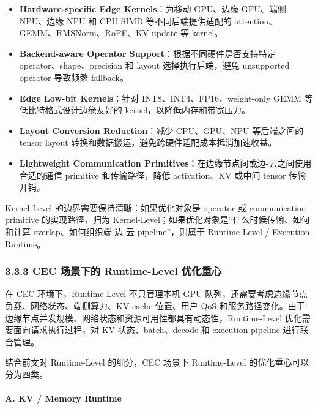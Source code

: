 \documentclass[a4paper,twocolumn,10pt]{ctexart}
\begin{document}
\begin{itemize}
\item \textbf{Hardware-specific Edge Kernels}：为移动 GPU、边缘 GPU、端侧 NPU、边缘 NPU 和 CPU SIMD 等不同后端提供适配的 attention、GEMM、RMSNorm、RoPE、KV update 等 kernel。

\item \textbf{Backend-aware Operator Support}：根据不同硬件是否支持特定 operator、shape、precision 和 layout 选择执行后端，避免 unsupported operator 导致频繁 fallback。

\item \textbf{Edge Low-bit Kernels}：针对 INT8、INT4、FP16、weight-only GEMM 等低比特格式设计边缘友好的 kernel，以降低内存和带宽压力。

\item \textbf{Layout Conversion Reduction}：减少 CPU、GPU、NPU 等后端之间的 tensor layout 转换和数据搬运，避免跨硬件适配成本抵消加速收益。

\item \textbf{Lightweight Communication Primitives}：在边缘节点间或边-云之间使用合适的通信 primitive 和传输路径，降低 activation、KV 或中间 tensor 传输开销。



\end{itemize}
Kernel-Level 的边界需要保持清晰：如果优化对象是 operator 或 communication primitive 的实现路径，归为 Kernel-Level；如果优化对象是“什么时候传输、如何和计算 overlap、如何组织端-边-云 pipeline”，则属于 Runtime-Level / Execution Runtime。








\subsubsection{3.3.3 CEC 场景下的 Runtime-Level 优化重心}



在 CEC 环境下，Runtime-Level 不只管理本机 GPU 队列，还需要考虑边缘节点负载、网络状态、端侧算力、KV cache 位置、用户 QoS 和服务路径变化。由于边缘节点并发规模、网络状态和资源可用性都具有动态性，Runtime-Level 优化需要面向请求执行过程，对 KV 状态、batch、decode 和 execution pipeline 进行联合管理。




结合前文对 Runtime-Level 的细分，CEC 场景下 Runtime-Level 的优化重心可以分为四类。




\paragraph*{A. KV / Memory Runtime}
\end{document}
